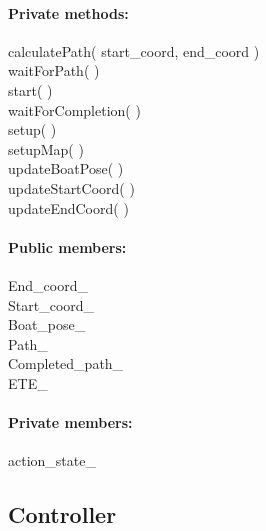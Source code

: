\paragraph{Private methods:}
\begin{adjustwidth}{2.5em}{0pt}\begin{description}
		\item [calculatePath( start_coord, end_coord )] 
		\item [waitForPath( )]
		\item [start( )]
		\item [waitForCompletion( )]
		\item [setup( )]
		\item [setupMap( )]
		\item [updateBoatPose( )]
		\item [updateStartCoord( )]
		\item [updateEndCoord( )]
\end{description}\end{adjustwidth}

\paragraph{Public members:}
\begin{adjustwidth}{2.5em}{0pt}\begin{description}
		\item [End_coord_]
		\item [Start_coord_]
		\item [Boat_pose_]
		\item [Path_]
		\item[Completed_path_]
		\item[ETE_] 
\end{description}\end{adjustwidth}


\paragraph{Private members:}
\begin{adjustwidth}{2.5em}{0pt}\begin{description}
		\item [action_state_] 
\end{description}\end{adjustwidth}



\subsection{Controller}